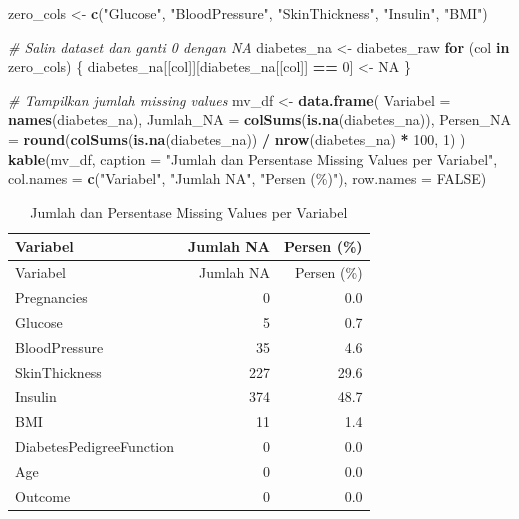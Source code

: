 \documentclass[
  11pt,
]{article}
\newenvironment{Shaded}{\begin{snugshade}}{\end{snugshade}}
\newcommand{\AttributeTok}[1]{\textcolor[rgb]{0.13,0.29,0.53}{#1}}
\newcommand{\CommentTok}[1]{\textcolor[rgb]{0.56,0.35,0.01}{\textit{#1}}}
\newcommand{\ConstantTok}[1]{\textcolor[rgb]{0.56,0.35,0.01}{#1}}
\newcommand{\ControlFlowTok}[1]{\textcolor[rgb]{0.13,0.29,0.53}{\textbf{#1}}}
\newcommand{\DecValTok}[1]{\textcolor[rgb]{0.00,0.00,0.81}{#1}}
\newcommand{\FunctionTok}[1]{\textcolor[rgb]{0.13,0.29,0.53}{\textbf{#1}}}
\newcommand{\NormalTok}[1]{#1}
\newcommand{\OtherTok}[1]{\textcolor[rgb]{0.56,0.35,0.01}{#1}}
\newcommand{\SpecialCharTok}[1]{\textcolor[rgb]{0.81,0.36,0.00}{\textbf{#1}}}
\newcommand{\StringTok}[1]{\textcolor[rgb]{0.31,0.60,0.02}{#1}}
\begin{document}
\begin{Shaded}
\begin{Highlighting}[]
\NormalTok{zero\_cols }\OtherTok{\textless{}{-}} \FunctionTok{c}\NormalTok{(}\StringTok{"Glucose"}\NormalTok{, }\StringTok{"BloodPressure"}\NormalTok{, }\StringTok{"SkinThickness"}\NormalTok{, }\StringTok{"Insulin"}\NormalTok{, }\StringTok{"BMI"}\NormalTok{)}

\CommentTok{\# Salin dataset dan ganti 0 dengan NA}
\NormalTok{diabetes\_na }\OtherTok{\textless{}{-}}\NormalTok{ diabetes\_raw}
\ControlFlowTok{for}\NormalTok{ (col }\ControlFlowTok{in}\NormalTok{ zero\_cols) \{}
\NormalTok{  diabetes\_na[[col]][diabetes\_na[[col]] }\SpecialCharTok{==} \DecValTok{0}\NormalTok{] }\OtherTok{\textless{}{-}} \ConstantTok{NA}
\NormalTok{\}}

\CommentTok{\# Tampilkan jumlah missing values}
\NormalTok{mv\_df }\OtherTok{\textless{}{-}} \FunctionTok{data.frame}\NormalTok{(}
  \AttributeTok{Variabel   =} \FunctionTok{names}\NormalTok{(diabetes\_na),}
  \AttributeTok{Jumlah\_NA  =} \FunctionTok{colSums}\NormalTok{(}\FunctionTok{is.na}\NormalTok{(diabetes\_na)),}
  \AttributeTok{Persen\_NA  =} \FunctionTok{round}\NormalTok{(}\FunctionTok{colSums}\NormalTok{(}\FunctionTok{is.na}\NormalTok{(diabetes\_na)) }\SpecialCharTok{/} \FunctionTok{nrow}\NormalTok{(diabetes\_na) }\SpecialCharTok{*} \DecValTok{100}\NormalTok{, }\DecValTok{1}\NormalTok{)}
\NormalTok{)}
\FunctionTok{kable}\NormalTok{(mv\_df, }\AttributeTok{caption =} \StringTok{"Jumlah dan Persentase Missing Values per Variabel"}\NormalTok{,}
      \AttributeTok{col.names =} \FunctionTok{c}\NormalTok{(}\StringTok{"Variabel"}\NormalTok{, }\StringTok{"Jumlah NA"}\NormalTok{, }\StringTok{"Persen (\%)"}\NormalTok{),}
      \AttributeTok{row.names =} \ConstantTok{FALSE}\NormalTok{)}
\end{Highlighting}
\end{Shaded}

\begin{longtable}[]{@{}lrr@{}}
\caption{Jumlah dan Persentase Missing Values per
Variabel}\tabularnewline
\toprule\noalign{}
Variabel & Jumlah NA & Persen (\%) \\
\midrule\noalign{}
\endfirsthead
\toprule\noalign{}
Variabel & Jumlah NA & Persen (\%) \\
\midrule\noalign{}
\endhead
\bottomrule\noalign{}
\endlastfoot
Pregnancies & 0 & 0.0 \\
Glucose & 5 & 0.7 \\
BloodPressure & 35 & 4.6 \\
SkinThickness & 227 & 29.6 \\
Insulin & 374 & 48.7 \\
BMI & 11 & 1.4 \\
DiabetesPedigreeFunction & 0 & 0.0 \\
Age & 0 & 0.0 \\
Outcome & 0 & 0.0 \\
\end{longtable}
\end{document}
